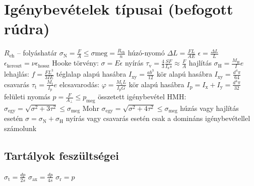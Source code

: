 \section{Igénybevételek típusai (befogott rúdra)}%

\begin{outline}
	\1 $R_\text{eh}$ -- folyáshatár
	\1 $\sigma_\text{N} = \frac{F}{A}\le\sigma\text{meg}=\frac{R_\text{eh}}{n}$
	\1 húzó-nyomó
		\2 $\Delta L = \frac{FL}{AE}$
		\2 $\epsilon = \frac{\Delta L}{L}$
		\2 $\epsilon_\text{kereszt} = \nu\epsilon_\text{hossz}$
		\2 Hooke törvény: $\sigma=E\epsilon$
	\1 nyírás
		\2 $\tau_\text{v} = \frac{4}{3}\frac{SF}{I_\text{x}s} \approx \frac{F}{A}$
	\1 hajlítás
		\2 $\sigma_\text{H} = \frac{M_\text{H}}{I}e$
		\2 lehajlás: $f = \frac{FL^3}{3IE}$
		\2 téglalap alapú hasábra $I_\text{xy}=\frac{ab^3}{12}$
		\2 kör alapú hasábra $I_\text{xy}=\frac{d^4\pi}{64}$
	\1 csavarás
		\2 $\tau_\text{t} = \frac{M_\text{t}}{I_\text{p}}e$
		\2 elcsavarodás: $\varphi = \frac{M_\text{t}L}{I_\text{p}G}$
		\2 kör alapú hasábra $I_\text{p}=I_\text{x}+I_\text{y}=\frac{d^4\pi}{32}$
	\1 felületi nyomás
		\2 $p = \frac{F}{A_\perp}\le p_\text{meg}$
	\1 összetett igénybevétel
		\2 HMH: $\sigma_\text{egy} = \sqrt{\sigma^2+3\tau^2}\le\sigma_\text{meg}$
		\2 Mohr $\sigma_\text{egy} = \sqrt{\sigma^2+4\tau^2}\le\sigma_\text{meg}$
		\2 húzás vagy hajlítás esetén $\sigma = \sigma_\text{N}+\sigma_\text{H}$
		\2 nyírás vagy csavarás esetén csak a domináns igénybevétellel számolunk
\end{outline}

\subsection{Tartályok feszültségei}

\begin{outline}
	\1 $\sigma_\text{t} = \frac{dp}{2s} $
	\1 $\sigma_\text{ax} = \frac{dp}{4s} $
	\1 $ \sigma_\text{r} = p $
\end{outline}
